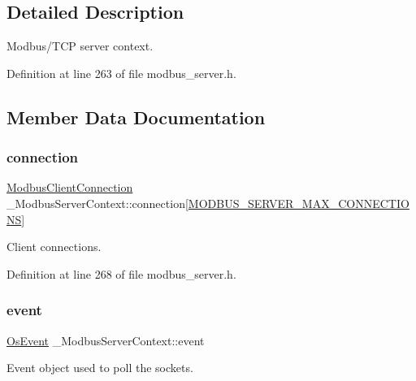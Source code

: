 \subsection{Detailed Description}
Modbus/\+T\+CP server context. 

Definition at line 263 of file modbus\+\_\+server.\+h.



\subsection{Member Data Documentation}
\mbox{\label{struct__ModbusServerContext_ab70c1f99b43abbef982d8bd01d55a278}} 
\subsubsection{\texorpdfstring{connection}{connection}}
{\footnotesize\ttfamily \hyperlink{modbus__server_8h_a9bb52dfbcf1ed2f018736b720a3b0748}{Modbus\+Client\+Connection} \+\_\+\+Modbus\+Server\+Context\+::connection\mbox{[}\hyperlink{modbus__server_8h_ae256368c84a889cda6e1e67109c23ee6}{M\+O\+D\+B\+U\+S\+\_\+\+S\+E\+R\+V\+E\+R\+\_\+\+M\+A\+X\+\_\+\+C\+O\+N\+N\+E\+C\+T\+I\+O\+NS}\mbox{]}}



Client connections. 



Definition at line 268 of file modbus\+\_\+server.\+h.

\mbox{\label{struct__ModbusServerContext_a1816bb4adf2b82bdc288e034d16f242a}} 
\subsubsection{\texorpdfstring{event}{event}}
{\footnotesize\ttfamily \hyperlink{structOsEvent}{Os\+Event} \+\_\+\+Modbus\+Server\+Context\+::event}



Event object used to poll the sockets. 



